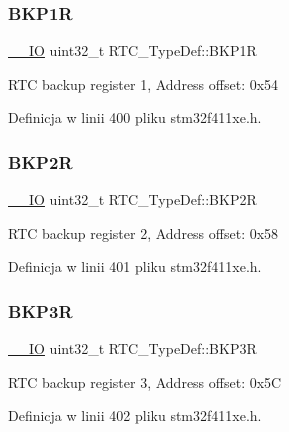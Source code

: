 \subsubsection{\texorpdfstring{B\+K\+P1R}{BKP1R}}
{\footnotesize\ttfamily \hyperlink{core__sc300_8h_aec43007d9998a0a0e01faede4133d6be}{\+\_\+\+\_\+\+IO} uint32\+\_\+t R\+T\+C\+\_\+\+Type\+Def\+::\+B\+K\+P1R}

R\+TC backup register 1, Address offset\+: 0x54 

Definicja w linii 400 pliku stm32f411xe.\+h.

\mbox{\label{struct_r_t_c___type_def_aa845c401b24d2ef1049f489f26d35626}} 
\subsubsection{\texorpdfstring{B\+K\+P2R}{BKP2R}}
{\footnotesize\ttfamily \hyperlink{core__sc300_8h_aec43007d9998a0a0e01faede4133d6be}{\+\_\+\+\_\+\+IO} uint32\+\_\+t R\+T\+C\+\_\+\+Type\+Def\+::\+B\+K\+P2R}

R\+TC backup register 2, Address offset\+: 0x58 

Definicja w linii 401 pliku stm32f411xe.\+h.

\mbox{\label{struct_r_t_c___type_def_ac3802c3b17482a0667fb34ddd1863434}} 
\subsubsection{\texorpdfstring{B\+K\+P3R}{BKP3R}}
{\footnotesize\ttfamily \hyperlink{core__sc300_8h_aec43007d9998a0a0e01faede4133d6be}{\+\_\+\+\_\+\+IO} uint32\+\_\+t R\+T\+C\+\_\+\+Type\+Def\+::\+B\+K\+P3R}

R\+TC backup register 3, Address offset\+: 0x5C 

Definicja w linii 402 pliku stm32f411xe.\+h.

\mbox{\label{struct_r_t_c___type_def_a6131b2f2896c122cf223206e4cfd2bd0}} 
